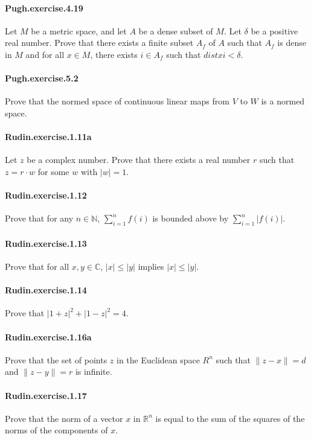 \documentclass{article}
\begin{document}
\paragraph{Pugh.exercise.4.19} Let $M$ be a metric space, and let $A$ be a dense subset of $M$. Let $\delta$ be a positive real number. Prove that there exists a finite subset $A_f$ of $A$ such that $A_f$ is dense in $M$ and for all $x \in M$, there exists $i \in A_f$ such that $dist x i < \delta$.

\paragraph{Pugh.exercise.5.2} Prove that the normed space of continuous linear maps from $V$ to $W$ is a normed space.

\paragraph{Rudin.exercise.1.11a} Let $z$ be a complex number. Prove that there exists a real number $r$ such that $z = r \cdot w$ for some $w$ with $|w|=1$.

\paragraph{Rudin.exercise.1.12} Prove that for any $n \in \mathbb{N}$, $\sum_{i=1}^n f(i)$ is bounded above by $\sum_{i=1}^n |f(i)|$.

\paragraph{Rudin.exercise.1.13} Prove that for all $x, y \in \mathbb{C}$, $|x| \leq |y|$ implies $|x| \leq |y|$.

\paragraph{Rudin.exercise.1.14} Prove that $|1+z|^2+|1-z|^2=4$.

\paragraph{Rudin.exercise.1.16a} Prove that the set of points $z$ in the Euclidean space $R^n$ such that $\|z - x\| = d$ and $\|z - y\| = r$ is infinite.

\paragraph{Rudin.exercise.1.17} Prove that the norm of a vector $x$ in $\mathbb{R}^n$ is equal to the sum of the squares of the norms of the components of $x$.
\end{document}
